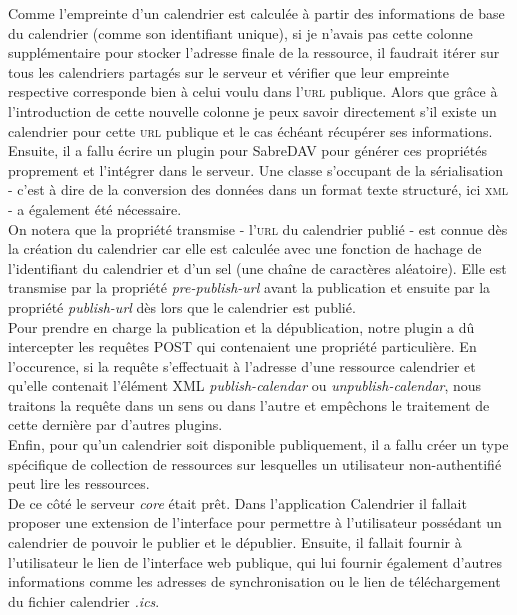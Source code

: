 \documentclass[10pt,a4paper, twoside]{report}
\begin{document}
	Comme l'empreinte d'un calendrier est calculée à partir des informations de base du calendrier (comme son identifiant unique), si je n'avais pas cette colonne supplémentaire pour stocker l'adresse finale de la ressource, il faudrait itérer sur tous les calendriers partagés sur le serveur et vérifier que leur empreinte respective corresponde bien à celui voulu dans l'\textsc{url} publique. Alors que grâce à l'introduction de cette nouvelle colonne je peux savoir directement s'il existe un calendrier pour cette \textsc{url} publique et le cas échéant récupérer ses informations.
	\\
	
	Ensuite, il a fallu écrire un plugin pour SabreDAV pour générer ces propriétés proprement et l'intégrer dans le serveur. Une classe s'occupant de la sérialisation - c'est à dire de la conversion des données dans un format texte structuré, ici \textsc{xml} - a également été nécessaire.
	\\
	
	On notera que la propriété transmise - l'\textsc{url} du calendrier publié - est connue dès la création du calendrier car elle est calculée avec une fonction de hachage de l'identifiant du calendrier et d'un sel (une chaîne de caractères aléatoire).
	Elle est transmise par la propriété \textit{pre-publish-url} avant la publication et ensuite par la propriété \textit{publish-url} dès lors que le calendrier est publié.
	\\
	
	Pour prendre en charge la publication et la dépublication, notre plugin a dû intercepter les requêtes POST qui contenaient une propriété particulière.
	En l'occurence, si la requête s'effectuait à l'adresse d'une ressource calendrier et qu'elle contenait l'élément XML \textit{publish-calendar} ou \textit{unpublish-calendar}, nous traitons la requête dans un sens ou dans l'autre et empêchons le traitement de cette dernière par d'autres plugins.
	\\
	
	Enfin, pour qu'un calendrier soit disponible publiquement, il a fallu créer un type spécifique de collection de ressources sur lesquelles un utilisateur non-authentifié peut lire les ressources.
	\\
	
	De ce côté le serveur \textit{core} était prêt. Dans l'application Calendrier il fallait proposer une extension de l'interface pour permettre à l'utilisateur possédant un calendrier de pouvoir le publier et le dépublier. Ensuite, il fallait fournir à l'utilisateur le lien de l'interface web publique, qui lui fournir également d'autres informations comme les adresses de synchronisation ou le lien de téléchargement du fichier calendrier \textit{.ics}.
	\\
	
\end{document}
